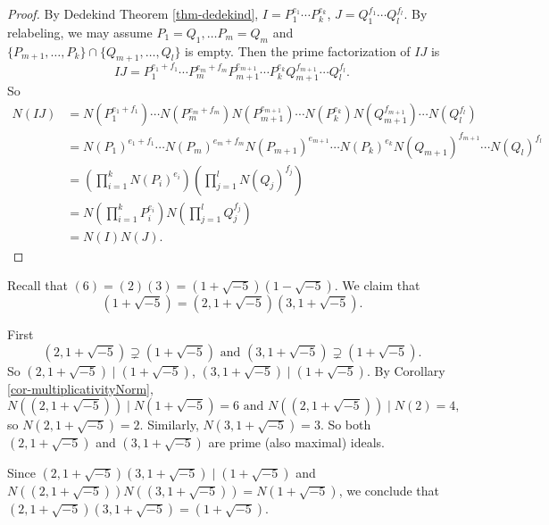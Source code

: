 \begin{proof}
    By Dedekind Theorem \ref{thm-dedekind}, $I=P_{1}^{e_{1}}\cdots P_{k}^{e_{k}}$, $J=Q_{1}^{f_{1}}\cdots Q_{l}^{f_{l}}$. By relabeling, we may assume $P_{1}=Q_{1},\dots P_{m}=Q_{m}$ and $\{P_{m+1}, \dots, P_k\} \cap \{Q_{m+1}, \dots, Q_l\}$ is empty. Then the prime factorization of $IJ$ is 
    \[
    IJ=P_{1}^{e_{1}+f_{1}}\cdots P_{m}^{e_{m}+f_{m}}P_{m+1}^{e_{m+1}}\cdots P_{k}^{e_{k}}Q_{m+1}^{f_{m+1}}\cdots Q_{l}^{f_{l}}. 
    \]
    So 
    \[
    \begin{aligned}
        N(IJ)&=N(P_{1}^{e_{1}+f_{1}})\cdots N(P_{m}^{e_{m}+f_{m}})N(P_{m+1}^{e_{m+1}})\cdots N(P_{k}^{e_{k}})N(Q_{m+1}^{f_{m+1}})\cdots N(Q_{l}^{f_{l}})\\
        &=N(P_{1})^{e_{1}+f_{1}}\cdots N(P_{m})^{e_{m}+f_{m}}N(P_{m+1})^{e_{m+1}}\cdots N(P_{k})^{e_{k}}N(Q_{m+1})^{f_{m+1}}\cdots N(Q_{l})^{f_{l}}\\
        &=(\prod_{i=1}^{k}N(P_{i})^{e_{i}})(\prod_{j=1}^{l}N(Q_{j})^{f_{j}})\\
        &=N(\prod_{i=1}^{k}P_{i}^{e_{i}})N(\prod_{j=1}^{l}Q_{j}^{f_{j}})\\
        &=N(I)N(J). 
    \end{aligned}
    \]
\end{proof}

\begin{example}
    Recall that $(6)=(2)(3)=(1+\sqrt{-5})(1-\sqrt{-5})$. We claim that 
    \[(1+\sqrt{-5})=(2,1+\sqrt{-5})(3,1+\sqrt{-5}).\]

    First 
    \[(2,1+\sqrt{-5})\supsetneq (1+\sqrt{-5}) \text{ and } (3,1+\sqrt{-5})\supsetneq (1+\sqrt{-5}). 
    \]
    So $(2,1+\sqrt{-5})\mid (1+\sqrt{-5})$, $(3,1+\sqrt{-5})\mid (1+\sqrt{-5})$. By Corollary \ref{cor-multiplicativityNorm}, 
    \[N((2,1+\sqrt{-5}))\mid N(1+\sqrt{-5})=6 \text{ and } N((2,1+\sqrt{-5}))\mid N(2)=4,\] 
    so $N(2,1+\sqrt{-5})=2$. Similarly, $N(3,1+\sqrt{-5})=3$. So both $(2,1+\sqrt{-5})$ and $(3,1+\sqrt{-5})$ are prime (also maximal) ideals. 

    Since $(2,1+\sqrt{-5})(3,1+\sqrt{-5})\mid (1+\sqrt{-5})$ and $N((2,1+\sqrt{-5}))N((3,1+\sqrt{-5}))=N(1+\sqrt{-5})$, we conclude that $(2,1+\sqrt{-5})(3,1+\sqrt{-5})=(1+\sqrt{-5})$. 
\end{example}
